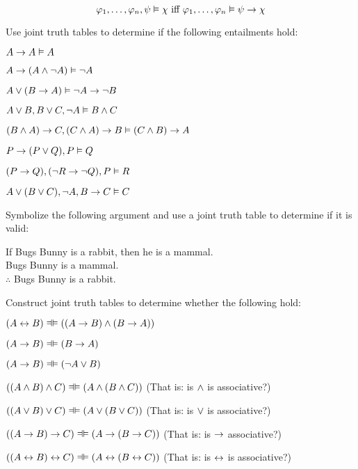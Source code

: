 $$\mathcal{\varphi}_1, \ldots, \mathcal{\varphi}_n, \mathcal{\psi} \vDash \mathcal{\chi} \text{ iff } \mathcal{\varphi}_1, \ldots, \mathcal{\varphi}_n \vDash \mathcal{\psi} \rightarrow \mathcal{\chi}$$



\practiceproblems
\problempart
Use joint truth tables to determine if the following entailments hold:
\begin{earg}
\item $A\rightarrow A \vDash A$ %
\item $A\rightarrow(A\wedge\neg A) \vDash \neg A$ %
\item $A\vee(B\rightarrow A) \vDash \neg A \rightarrow \neg B$ %
\item $A\vee B, B\vee C, \neg A \vDash B \wedge C$ %
\item $(B\wedge A)\rightarrow C, (C\wedge A)\rightarrow B \vDash (C\wedge B)\rightarrow A$ %
\item $P \rightarrow (P \vee Q), P \vDash Q$
\item $(P \rightarrow Q), (\neg R \rightarrow \neg Q), P \vDash R$
\item $A\vee(B\vee C), \neg A, B\rightarrow C \vDash C$ \\
\end{earg}


\problempart
Symbolize the following argument  and use a joint truth table to determine if it is valid:
\begin{earg}
\item[] If Bugs Bunny is a rabbit, then he is a mammal.\\
Bugs Bunny is a mammal.\\
$\therefore$ Bugs Bunny is a rabbit.

\end{earg}



\problempart
Construct joint truth tables to determine whether the following hold:
\begin{earg}
	\item $(A \eiff B) \lequiv ((A \eif B) \eand (B \eif A))$
	\item $(A \eif B) \lequiv (B \eif A)$
	\item $(A \eif B) \lequiv (\enot A \eor B)$
	\item $((A \eand B) \eand C) \lequiv (A \eand (B \eand C))$ (That is: is $\wedge$ is associative?)
	\item $((A \eor B) \eor C) \lequiv (A \eor (B \eor C))$ (That is: is $\vee$ is associative?)
	\item $((A \eif B) \eif C) \lequiv (A \eif (B \eif C))$ (That is: is $\rightarrow$ associative?)
	\item $((A \eiff B) \eiff C) \lequiv (A \eiff (B \eiff C))$ (That is: is $\leftrightarrow$ is associative?)
\end{earg}

